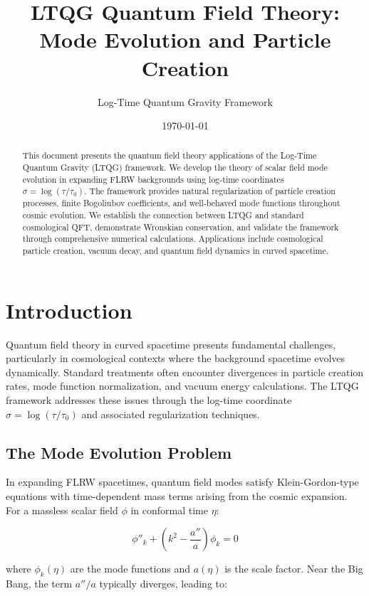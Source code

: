 \documentclass[11pt,a4paper]{article}
\title{\textbf{LTQG Quantum Field Theory:\\
Mode Evolution and Particle Creation}}
\author{Log-Time Quantum Gravity Framework}
\date{\today}
\begin{document}
\maketitle

\begin{abstract}
This document presents the quantum field theory applications of the Log-Time Quantum Gravity (LTQG) framework. We develop the theory of scalar field mode evolution in expanding FLRW backgrounds using log-time coordinates $\sigma = \log(\tau/\tau_0)$. The framework provides natural regularization of particle creation processes, finite Bogoliubov coefficients, and well-behaved mode functions throughout cosmic evolution. We establish the connection between LTQG and standard cosmological QFT, demonstrate Wronskian conservation, and validate the framework through comprehensive numerical calculations. Applications include cosmological particle creation, vacuum decay, and quantum field dynamics in curved spacetime.
\end{abstract}

\tableofcontents
\newpage

\section{Introduction}

Quantum field theory in curved spacetime presents fundamental challenges, particularly in cosmological contexts where the background spacetime evolves dynamically. Standard treatments often encounter divergences in particle creation rates, mode function normalization, and vacuum energy calculations. The LTQG framework addresses these issues through the log-time coordinate $\sigma = \log(\tau/\tau_0)$ and associated regularization techniques.

\subsection{The Mode Evolution Problem}

In expanding FLRW spacetimes, quantum field modes satisfy Klein-Gordon-type equations with time-dependent mass terms arising from the cosmic expansion. For a massless scalar field $\phi$ in conformal time $\eta$:

\begin{equation}
\phi''_k + \left(k^2 - \frac{a''}{a}\right) \phi_k = 0
\end{equation}

where $\phi_k(\eta)$ are the mode functions and $a(\eta)$ is the scale factor. Near the Big Bang, the term $a''/a$ typically diverges, leading to:
\end{document}
